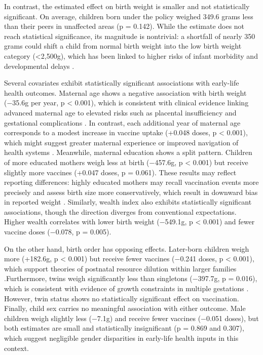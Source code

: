 \documentclass[]{AEA}
\begin{document}
In contrast, the estimated effect on birth weight is smaller and not
statistically significant. On average, children born under the policy
weighed 349.6 grams less than their peers in unaffected areas (p =
0.142). While the estimate does not reach statistical significance, its
magnitude is nontrivial: a shortfall of nearly 350 grams could shift a
child from normal birth weight into the low birth weight category
(\textless2,500g), which has been linked to higher risks of infant
morbidity and developmental delays \citep{katz2013mortality}.

Several covariates exhibit statistically significant associations with
early-life health outcomes. Maternal age shows a negative association
with birth weight (−35.6g per year, p \textless{} 0.001), which is
consistent with clinical evidence linking advanced maternal age to
elevated risks such as placental insufficiency and gestational
complications \citep{lean2023placental}. In contrast, each additional
year of maternal age corresponds to a modest increase in vaccine uptake
(+0.048 doses, p \textless{} 0.001), which might suggest greater
maternal experience or improved navigation of health systems
\citep{barker2021vaccination}. Meanwhile, maternal education shows a
split pattern. Children of more educated mothers weigh less at birth
(−457.6g, p \textless{} 0.001) but receive slightly more vaccines
(+0.047 doses, p = 0.061). These results may reflect reporting
differences: highly educated mothers may recall vaccination events more
precisely and assess birth size more conservatively, which result in
downward bias in reported weight \citep{filmer2001health}. Similarly,
wealth index also exhibits statistically significant associations,
though the direction diverges from conventional expectations. Higher
wealth correlates with lower birth weight (−549.1g, p \textless{} 0.001)
and fewer vaccine doses (−0.078, p = 0.005).

On the other hand, birth order has opposing effects. Later-born children
weigh more (+182.6g, p \textless{} 0.001) but receive fewer vaccines
(−0.241 doses, p \textless{} 0.001), which support theories of postnatal
resource dilution within larger families
\citep{black2008maternal}.Furthermore, twins weigh significantly less
than singletons (−397.7g, p = 0.016), which is consistent with evidence
of growth constraints in multiple gestations
\citep{klebanoff2005multiple}. However, twin status shows no
statistically significant effect on vaccination. Finally, child sex
carries no meaningful association with either outcome. Male children
weigh slightly less (−7.1g) and receive fewer vaccines (−0.051 doses),
but both estimates are small and statistically insignificant (p = 0.869
and 0.307), which suggest negligible gender disparities in early-life
health inputs in this context.
\end{document}
